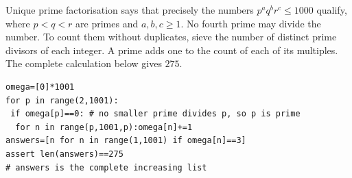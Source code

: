 Unique prime factorisation says that precisely the numbers $ p^aq^br^c\le1000 $ qualify, where $ p<q<r $ are primes and $ a,b,c\ge1 $. No fourth prime may divide the number. To count them without duplicates, sieve the number of distinct prime divisors of each integer. A prime adds one to the count of each of its multiples. The complete calculation below gives $\boxed{275}$.
\begin{verbatim}
omega=[0]*1001
for p in range(2,1001):
 if omega[p]==0: # no smaller prime divides p, so p is prime
  for n in range(p,1001,p):omega[n]+=1
answers=[n for n in range(1,1001) if omega[n]==3]
assert len(answers)==275
# answers is the complete increasing list
\end{verbatim}
